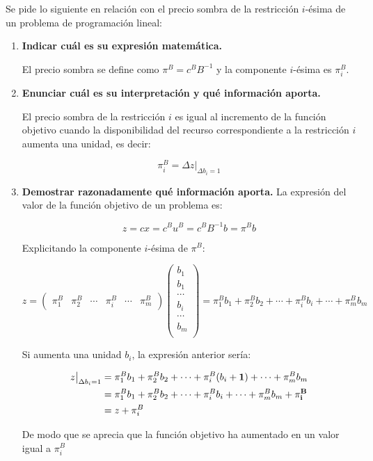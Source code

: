 Se pide lo siguiente en relación con el precio sombra de la restricción $i$-ésima de un problema de programación lineal:

\begin{enumerate}[label=\alph*)]
\item \textbf{Indicar cuál es su expresión matemática.}

El precio sombra se define como $\pi^B=c^BB^{-1}$ y la componente $i$-ésima es $\pi^B_i$.

\item \textbf{Enunciar cuál es su interpretación y qué información aporta.}

El precio sombra de la restricción $i$ es igual al incremento de la función objetivo cuando la disponibilidad del recurso correspondiente a la restricción $i$ aumenta una unidad, es decir:

\[
\pi^B_i = \Delta z|_{\Delta b_i=1}
\]

\item \textbf{Demostrar razonadamente qué información aporta.}
La expresión del valor de la función objetivo de un problema es:

\[
z = cx=c^Bu^B=c^BB^{-1}b=\pi^Bb
\]

Explicitando la componente $i$-ésima de $\pi^B$:

\[
z = \begin{pmatrix}
   \pi^B_1 &  \pi^B_2  & \cdots & \pi^B_i & \cdots & \pi^B_m
   \end{pmatrix}
   \begin{pmatrix}
   b_1 \\
   b_1 \\
   \cdots \\
   b_i \\
   \cdots \\
   b_m \\
   \end{pmatrix}
   = \pi^B_1b_1 + \pi^B_2b_2 + \cdots + \pi^B_ib_i + \cdots +\pi^B_mb_m
\]

Si aumenta una unidad $b_i$, la expresión anterior sería:

\begin{align}
z\big|_{\Delta b_i = 1} &= \pi^B_1 b_1 + \pi^B_2 b_2 + \cdots + \pi^B_i (b_i + \mathbf{1}) + \cdots + \pi^B_m b_m  \notag \\ 
&= \pi^B_1 b_1 + \pi^B_2 b_2 + \cdots + \pi^B_i b_i + \cdots + \pi^B_m b_m + \mathbf{\pi^B_i} \notag \\
&= z + \pi^B_i \notag
\end{align}

De modo que se aprecia que la función objetivo ha aumentado en un valor igual a $\pi^B_i$



\end{enumerate}